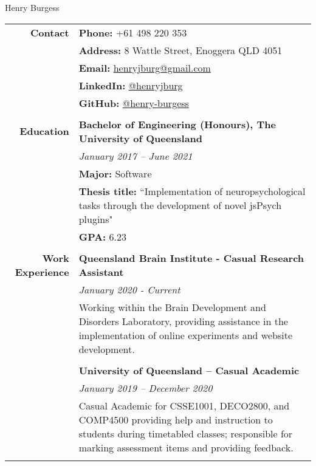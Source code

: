 \documentclass[a4paper]{article}
\begin{document}
\begin{center}
	\Huge{Henry Burgess}
\end{center}

\begin{longtable}{r p{13.5cm}} 
	\textbf{Contact} 		   \vline &	   \textbf{Phone:}  +61 498 220 353 \\ 
										\vline &	\textbf{Address:} 8 Wattle Street, Enoggera QLD 4051 \\
										\vline &	\textbf{Email:} \href{mailto:henryjburg@gmail.com}{henryjburg@gmail.com} \\
										\vline &	\textbf{LinkedIn:} \href{https://www.linkedin.com/in/henryjburg/}{@henryjburg} \\
										\vline &	\textbf{GitHub:} \href{https://github.com/henry-burgess}{@henry-burgess} \\
										\vline & \\
										
	\textbf{Education} 		\vline & \textbf{Bachelor of Engineering (Honours), The University of Queensland} \\
										\vline & \textit{January 2017 – June 2021} \\
										\vline & \textbf{Major:} Software \\
										\vline & \textbf{Thesis title:} ``Implementation of neuropsychological tasks through the development of novel jsPsych plugins" \\
										\vline & \textbf{GPA:} 6.23 \\
										\vline & \\
										
	\textbf{Work Experience} 	  \vline & \textbf{Queensland Brain Institute - Casual Research Assistant} \\
										\vline & \textit{January 2020 - Current} \\
										\vline & Working within the Brain Development and Disorders Laboratory, providing assistance in the implementation of online experiments and website development. \\ 
										\vline & \\
	
	 									\vline & \textbf{University of Queensland – Casual Academic} \\
										\vline & \textit{January 2019 – December 2020} \\
										\vline & Casual Academic for CSSE1001, DECO2800, and COMP4500 providing help and instruction to students during timetabled classes; responsible for marking assessment items and providing feedback. \\ 
										\vline & \\
										

\end{longtable}
\end{document}
